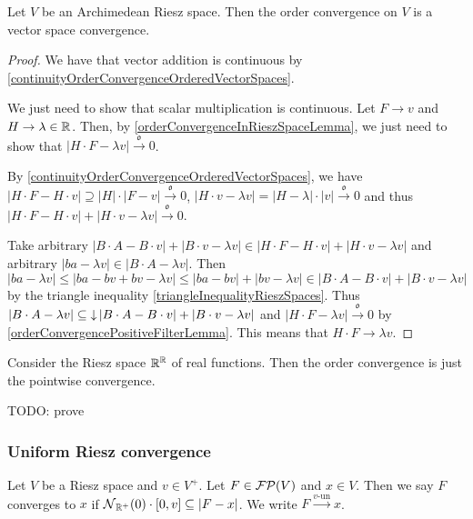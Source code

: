 \begin{proposition}
Let $V$ be an Archimedean Riesz space. Then the order convergence on $V$ is a vector space convergence.
\end{proposition}
\begin{proof}
We have that vector addition is continuous by \ref{continuityOrderConvergenceOrderedVectorSpaces}.

We just need to show that scalar multiplication is continuous. Let $F\to v$ and $H \to \lambda\in \mathbb{R}$. Then, by \ref{orderConvergenceInRieszSpaceLemma}, we just need to show that $|H\cdot F - \lambda v|\overset{\mathfrak{o}}{\longrightarrow} 0$.

By \ref{continuityOrderConvergenceOrderedVectorSpaces}, we have $|H\cdot F - H\cdot v| \supseteq |H|\cdot |F-v| \overset{\mathfrak{o}}{\longrightarrow} 0$, $|H\cdot v - \lambda v| = |H-\lambda|\cdot |v| \overset{\mathfrak{o}}{\longrightarrow} 0$ and thus $|H\cdot F - H\cdot v| + |H\cdot v - \lambda v| \overset{\mathfrak{o}}{\longrightarrow} 0$.

Take arbitrary $|B\cdot A - B\cdot v| + |B\cdot v - \lambda v| \in |H\cdot F - H\cdot v| + |H\cdot v - \lambda v|$ and arbitrary $|ba - \lambda v| \in |B\cdot A - \lambda v|$. Then
\[ |ba - \lambda v| \leq |ba - bv + bv - \lambda v| \leq |ba - bv| + |bv - \lambda v| \in |B\cdot A - B\cdot v| + |B\cdot v - \lambda v| \]
by the triangle inequality \ref{triangleInequalityRieszSpaces}. Thus $|B\cdot A - \lambda v| \subseteq \operatorname{\downarrow} |B\cdot A - B\cdot v| + |B\cdot v - \lambda v|$ and $|H\cdot F - \lambda v| \overset{\mathfrak{o}}{\longrightarrow} 0$ by \ref{orderConvergencePositiveFilterLemma}. This means that $H\cdot F \to \lambda v$.
\end{proof}

\begin{example}
Consider the Riesz space $\mathbb{R}^{\mathbb{R}}$ of real functions. Then the order convergence is just the pointwise convergence.

TODO: prove
\end{example}

\subsubsection{Uniform Riesz convergence}
\begin{definition}
Let $V$ be a Riesz space and $v\in V^+$. Let $F\in \operatorname{\mathcal{FP}}(V)$ and $x\in V$. Then we say $F$ converges  to $x$ if $\neighbourhood_{\R^+}(0)\cdot \interval{0,v} \subseteq |F - x|$. We write $F\overset{\text{$v$-un}}{\longrightarrow} x$.
\end{definition}

